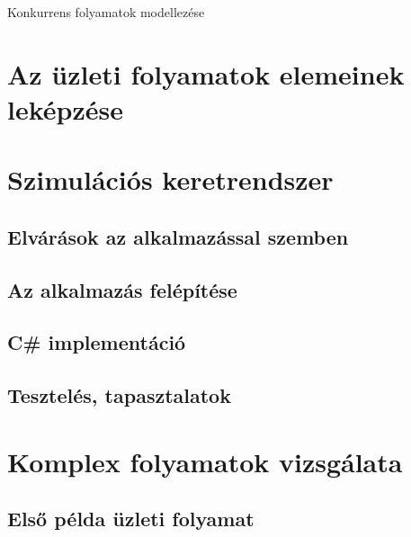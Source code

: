 \documentclass[12pt,a4paper]{book}
\begin{document}
Konkurrens folyamatok modellezése

\chapter{Az üzleti folyamatok elemeinek leképzése}


\chapter{Szimulációs keretrendszer}


\section{Elvárások az alkalmazással szemben}


\section{Az alkalmazás felépítése}


\section{C\# implementáció}


\section{Tesztelés, tapasztalatok}


\chapter{Komplex folyamatok vizsgálata}

\section{Első példa üzleti folyamat}
\end{document}

